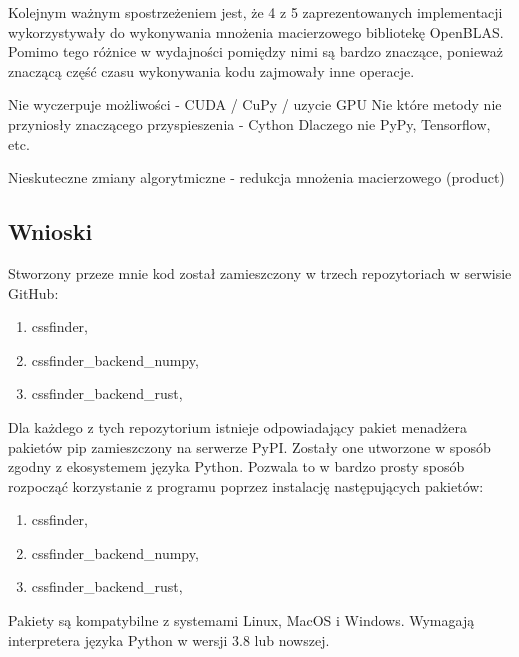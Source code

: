 \documentclass[11pt, a4paper]{article}
\begin{document}
\begin{sloppypar}
    Kolejnym ważnym spostrzeżeniem jest, że 4 z 5 zaprezentowanych implementacji wykorzystywały
    do wykonywania mnożenia macierzowego bibliotekę OpenBLAS. Pomimo tego różnice w
    wydajności pomiędzy nimi są bardzo znaczące, ponieważ znaczącą część czasu wykonywania
    kodu zajmowały inne operacje.

    Nie wyczerpuje możliwości - CUDA / CuPy / uzycie GPU Nie które metody nie przyniosły
    znaczącego przyspieszenia - Cython Dlaczego nie PyPy, Tensorflow, etc.

    Nieskuteczne zmiany algorytmiczne - redukcja mnożenia macierzowego (product)

    \subsection{Wnioski}


    Stworzony przeze mnie kod został zamieszczony w trzech repozytoriach w serwisie
    GitHub:
    \begin{enumerate}
      \item cssfinder\cite{CSSFinder_New},

      \item cssfinder\_backend\_numpy\cite{CSSFinder_New_Numpy},

      \item cssfinder\_backend\_rust\cite{CSSFinder_New_Rust},
    \end{enumerate}

    Dla każdego z tych repozytorium istnieje odpowiadający pakiet menadżera pakietów pip
    zamieszczony na serwerze PyPI. Zostały one utworzone w sposób zgodny z ekosystemem języka
    Python. Pozwala to w bardzo prosty sposób rozpocząć korzystanie z programu poprzez
    instalację następujących pakietów:
    \begin{enumerate}
      \item cssfinder\cite{CSSFinder_New_PyPI},

      \item cssfinder\_backend\_numpy\cite{CSSFinder_New_Numpy_PyPI},

      \item cssfinder\_backend\_rust\cite{CSSFinder_New_Rust_PyPI},
    \end{enumerate}

    Pakiety są kompatybilne z systemami Linux, MacOS i Windows. Wymagają interpretera
    języka Python w wersji 3.8 lub nowszej.
  \end{sloppypar}
  \newpage
  \begin{sloppypar}
    \medskip


    \printbibliography
    [heading=bibintoc, title={Odwołania}]
  \end{sloppypar}
\end{document}
